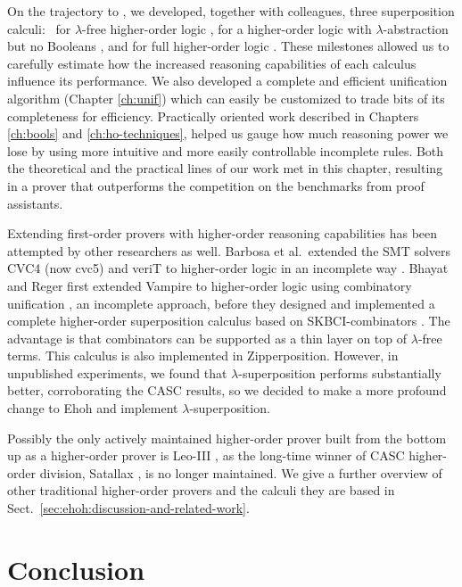   On the trajectory to \ehohii{}, we developed, together with colleagues, three
  superposition calculi:\ \lfsup{} for $\lambda$-free higher-order logic
  \cite{bbcw-21-lfho}, \lsup{} for a higher-order logic with
  $\lambda$-abstra\-ction but no Booleans \cite{bbtvw-21-sup-lam}, and \osup{}
  for full higher-order logic \cite{bbtvw-21-sup-lam}. These milestones allowed
  us to carefully estimate how the increased reasoning capabilities of each
  calculus influence its performance. We also developed a complete and efficient
  unification algorithm (Chapter \ref{ch:unif}) which can easily be customized
  to trade bits of its completeness for efficiency. Practically oriented work
  described in Chapters \ref{ch:bools} and \ref{ch:ho-techniques},
  helped us gauge how much reasoning power we lose by using more intuitive and
  more easily controllable incomplete rules. Both the theoretical and the
  practical lines of our work met in this chapter, resulting in a prover that
  outperforms the competition on the benchmarks from proof assistants.
  
  Extending first-order provers with higher-order reasoning capabilities has been
  attempted by other researchers as well.
  Barbosa et al.\ extended
  the SMT solvers CVC4 (now cvc5) and veriT to higher-order logic in an incomplete
  way \cite{brotb-19-ho-smt}.
  Bhayat and Reger first extended Vampire to
  higher-order logic using combinatory unification \cite{br-19-restricted-unif},
  an incomplete approach, before they designed and implemented a complete
  higher-order superposition calculus based on \textsf{SKBCI}-com\-binators \cite{br-20-full-sup-w-combs}.
  The advantage is that combinators can be supported as a thin layer on top of
  $\lambda$-free terms.
  This calculus is also implemented in Zipperposition.
  However, in unpublished experiments, we found that $\lambda$-superposition
  performs substantially better, corroborating the CASC results, so we decided to
  make a more profound change to Ehoh and implement $\lambda$-superposition.
  \pagebreak[2]

  Possibly the only actively maintained higher-order prover built from the bottom
  up as a higher-order prover is Leo-III \cite{sb-21-leo3}, as the long-time
  winner of CASC higher-order division, Satallax \cite{cb-12-satallax}, is no
  longer maintained. We give a further overview of other traditional higher-order
  provers and the calculi they are based in Sect.~\ref{sec:ehoh:discussion-and-related-work}.
  
  \section{Conclusion} %
  \label{sec:ehoh2:conclusion}
  
